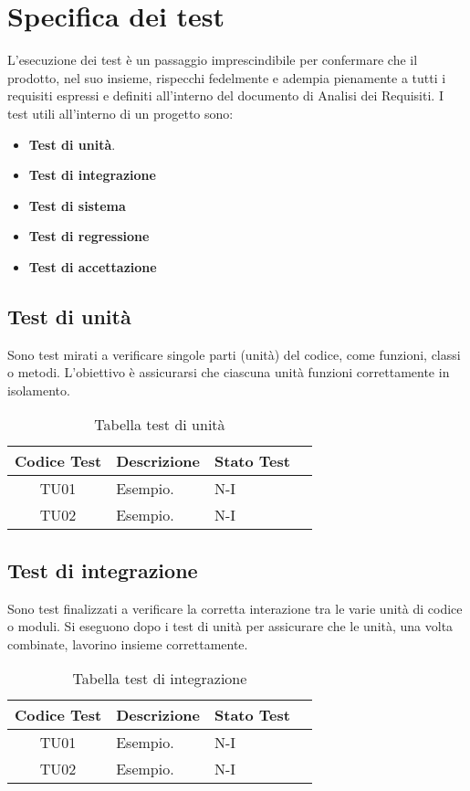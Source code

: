 \section{Specifica dei test}
L'esecuzione dei test è un passaggio imprescindibile per confermare che il prodotto, nel suo insieme, rispecchi fedelmente e adempia pienamente a tutti i requisiti espressi e definiti all'interno del documento di Analisi dei Requisiti. I test utili all'interno di un progetto sono:
\begin{itemize}
    \item \textbf{Test di unità}.
    \item \textbf{Test di integrazione}
    \item \textbf{Test di sistema}
    \item \textbf{Test di regressione}
    \item \textbf{Test di accettazione}
\end{itemize}
\subsection{Test di unità}
Sono test mirati a verificare singole parti (unità) del codice, come funzioni, classi o metodi. L'obiettivo è assicurarsi che ciascuna unità funzioni correttamente in isolamento.
\\
\begin{table}[htbp]
    \centering
    \begin{tabular}{|c|p{3cm}|p{5cm}|c|}
        \hline
        Codice Test & Descrizione & Stato Test \\
        \hline
        TU01 & Esempio. & N-I \\
        \hline
        TU02 & Esempio. & N-I \\
        \hline
    \end{tabular}
    \caption{Tabella test di unità}
    \label{tab:testsUnità}
\end{table}

\subsection{Test di integrazione}
Sono test finalizzati a verificare la corretta interazione tra le varie unità di codice o moduli. Si eseguono dopo i test di unità per assicurare che le unità, una volta combinate, lavorino insieme correttamente.
\\
\begin{table}[htbp]
    \centering
    \begin{tabular}{|c|p{3cm}|p{5cm}|c|}
        \hline
        Codice Test & Descrizione & Stato Test \\
        \hline
        TU01 & Esempio. & N-I \\
        \hline
        TU02 & Esempio. & N-I \\
        \hline
    \end{tabular}
    \caption{Tabella test di integrazione}
    \label{tab:testsIntegrazione}
\end{table}

